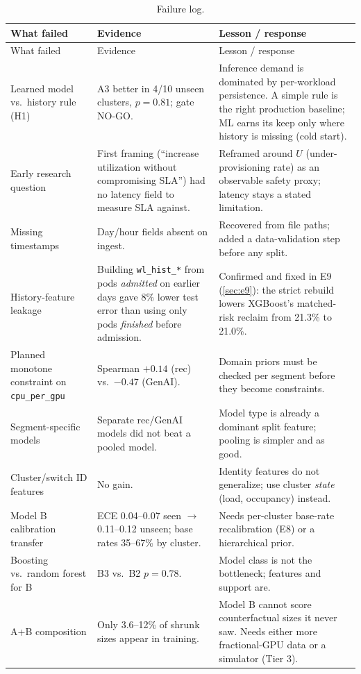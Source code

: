 \documentclass[11pt]{article}
\newcommand{\ra}{$\rightarrow$}
\begin{document}
\begin{longtable}{@{}p{3.4cm}p{5.6cm}p{5.6cm}@{}}
\caption{Failure log.}\label{tab:failures}\\
\toprule
What failed & Evidence & Lesson / response \\
\midrule
\endfirsthead
\toprule
What failed & Evidence & Lesson / response \\
\midrule
\endhead
Learned model vs.\ history rule (H1) & A3 better in 4/10 unseen clusters, $p=0.81$; gate NO-GO. & Inference demand is dominated by per-workload persistence. A simple rule is the right production baseline; ML earns its keep only where history is missing (cold start). \\
Early research question & First framing (``increase utilization without compromising SLA'') had no latency field to measure SLA against. & Reframed around $U$ (under-provisioning rate) as an observable safety proxy; latency stays a stated limitation. \\
Missing timestamps & Day/hour fields absent on ingest. & Recovered from file paths; added a data-validation step before any split. \\
History-feature leakage & Building \texttt{wl\_hist\_*} from pods \emph{admitted} on earlier days gave 8\% lower test error than using only pods \emph{finished} before admission. & Confirmed and fixed in E9 (\cref{sec:e9}): the strict rebuild lowers XGBoost's matched-risk reclaim from 21.3\% to 21.0\%. \\
Planned monotone constraint on \texttt{cpu\_per\_gpu} & Spearman $+0.14$ (rec) vs.\ $-0.47$ (GenAI). & Domain priors must be checked per segment before they become constraints. \\
Segment-specific models & Separate rec/GenAI models did not beat a pooled model. & Model type is already a dominant split feature; pooling is simpler and as good. \\
Cluster/switch ID features & No gain. & Identity features do not generalize; use cluster \emph{state} (load, occupancy) instead. \\
Model B calibration transfer & ECE 0.04--0.07 seen \ra 0.11--0.12 unseen; base rates 35--67\% by cluster. & Needs per-cluster base-rate recalibration (E8) or a hierarchical prior. \\
Boosting vs.\ random forest for B & B3 vs.\ B2 $p=0.78$. & Model class is not the bottleneck; features and support are. \\
A+B composition & Only 3.6--12\% of shrunk sizes appear in training. & Model B cannot score counterfactual sizes it never saw. Needs either more fractional-GPU data or a simulator (Tier 3). \\

\end{longtable}
\end{document}
